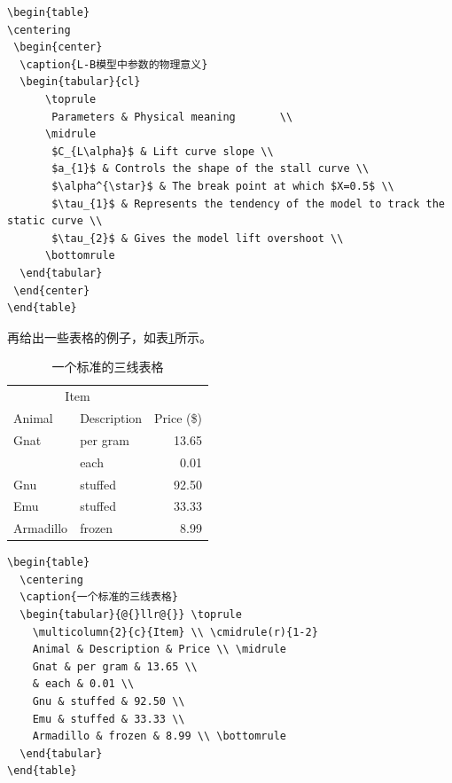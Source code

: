 \begin{lstlisting}[language={[LaTeX]TeX}, caption={插入表格\ref{tab:LB-parameters}}]
\begin{table}
\centering
 \begin{center}
  \caption{L-B模型中参数的物理意义}
  \begin{tabular}{cl}
      \toprule
       Parameters & Physical meaning       \\
      \midrule 
       $C_{L\alpha}$ & Lift curve slope \\
       $a_{1}$ & Controls the shape of the stall curve \\
       $\alpha^{\star}$ & The break point at which $X=0.5$ \\
       $\tau_{1}$ & Represents the tendency of the model to track the static curve \\
       $\tau_{2}$ & Gives the model lift overshoot \\
      \bottomrule
  \end{tabular}
 \end{center}
\end{table}
\end{lstlisting}

再给出一些表格的例子，如表\ref{tab:firstone}所示。

\begin{table}
  \centering
  \label{tab:firstone}
  \caption{一个标准的三线表格}
  \begin{tabular}{@{}llr@{}} \toprule
    \multicolumn{2}{c}{Item} \\ \cmidrule(r){1-2}
    Animal & Description & Price (\$)\\ \midrule
    Gnat & per gram & 13.65 \\
    & each & 0.01 \\
    Gnu & stuffed & 92.50 \\
    Emu & stuffed & 33.33 \\
    Armadillo & frozen & 8.99 \\ \bottomrule
  \end{tabular}
\end{table}

\begin{lstlisting}[language={[LaTeX]TeX}, caption={三线表格}]
\begin{table}
  \centering
  \caption{一个标准的三线表格}
  \begin{tabular}{@{}llr@{}} \toprule
    \multicolumn{2}{c}{Item} \\ \cmidrule(r){1-2}
    Animal & Description & Price \\ \midrule
    Gnat & per gram & 13.65 \\
    & each & 0.01 \\
    Gnu & stuffed & 92.50 \\
    Emu & stuffed & 33.33 \\
    Armadillo & frozen & 8.99 \\ \bottomrule
  \end{tabular}
\end{table}
\end{lstlisting}

